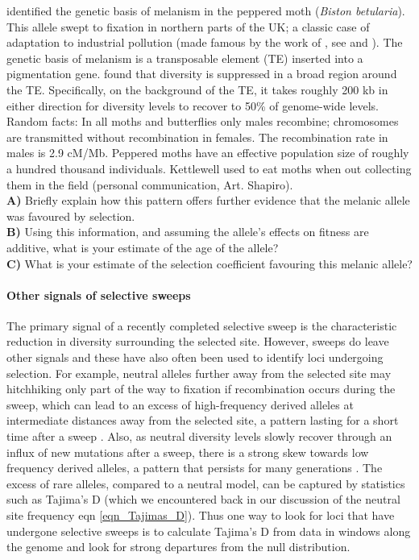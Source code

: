 \begin{question}
\citet{van2011industrial} identified the genetic basis of
melanism in the peppered moth ({\it Biston betularia}). This allele swept to fixation in northern
parts of the UK; a classic case of adaptation to industrial pollution
(made famous by the work of \citeauthor{kettlewell1955selection}, see
\citet{majerus2009industrial} and \citet{cook2012selective}). The genetic basis of melanism
is a transposable element (TE) inserted into a pigmentation gene. \citeauthor{van2011industrial} found that diversity is suppressed in a broad region
around the TE. Specifically, on the background of the TE, it takes
roughly 200 kb in either direction for diversity levels to recover to
50\% of genome-wide levels. \\

Random facts: In all moths and butterflies only males recombine;
chromosomes are transmitted without recombination in females. The
recombination rate in males is 2.9 cM/Mb.  Peppered moths have an
effective population size of roughly a hundred thousand
individuals. Kettlewell used to eat moths when out collecting them in
the field (personal communication, Art. Shapiro). \\
{\bf A)} Briefly explain how this pattern offers further evidence that the melanic allele was favoured by selection.\\
{\bf B)} Using this information, and assuming the allele's effects on fitness are additive, what is your estimate of the age of the allele? \\
{\bf C)} What is your estimate of the selection coefficient favouring this melanic allele?
\end{question}


\paragraph{Other signals of selective sweeps}
The primary signal of a recently completed selective sweep is the
characteristic reduction in diversity surrounding the selected site.
However, sweeps do leave other signals and these have also often been
used to identify loci undergoing selection. 
For example, neutral alleles further away from the selected site may
hitchhiking only part of the way to fixation if recombination occurs during
the sweep, which can lead to an excess of high-frequency
derived alleles at intermediate distances away from the selected site,
a pattern lasting for a short time after a sweep \citep{Fay:00,Przeworski:02,Kim:06}.
Also, as neutral diversity levels slowly recover through an influx of
new mutations after a sweep, there is a strong skew towards low
frequency derived alleles, a pattern that persists for many
generations \citep{Braverman:95, Przeworski:02,Kim:06}. The excess of
rare alleles, compared to a neutral model, can be captured by statistics such as Tajima's D (which
we encountered back in our discussion of the neutral site frequency eqn
\ref{eqn_Tajimas_D}). Thus one way to look for loci that have undergone selective sweeps is to calculate Tajima's D from data in
windows along the genome and look for
strong departures from the null distribution.

